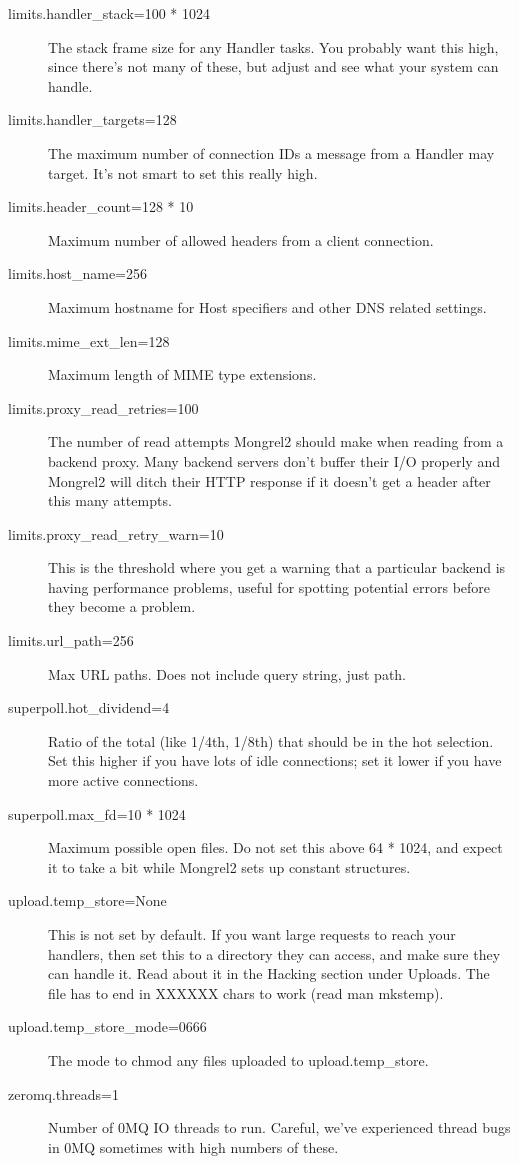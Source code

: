 \begin{description}
\item[limits.handler\_stack=100 * 1024] The stack frame size for any Handler tasks. You probably want this high, since there's not many of these, but adjust and see what your system can handle.
\item[limits.handler\_targets=128] The maximum number of connection IDs a message from a Handler may target.  It's not smart to set this really high.
\item[limits.header\_count=128 * 10] Maximum number of allowed headers from a client connection.
\item[limits.host\_name=256] Maximum hostname for Host specifiers and other DNS related settings.
\item[limits.mime\_ext\_len=128] Maximum length of MIME type extensions.
\item[limits.proxy\_read\_retries=100] The number of read attempts Mongrel2 should make when reading from a backend proxy. Many backend servers don't buffer their I/O properly and Mongrel2 will ditch their HTTP response if it doesn't get a header after this many attempts.
\item[limits.proxy\_read\_retry\_warn=10] This is the threshold where you get a warning that a particular backend is having performance problems, useful for spotting potential errors before they become a problem.
\item[limits.url\_path=256] Max URL paths. Does not include query string, just path.
\item[superpoll.hot\_dividend=4] Ratio of the total (like 1/4th, 1/8th) that should be in the hot selection.  Set this higher if you have lots of idle connections; set it lower if you have more active connections.
\item[superpoll.max\_fd=10 * 1024] Maximum possible open files.  Do not set this above 64 * 1024, and expect it to take a bit while Mongrel2 sets up constant structures.
\item[upload.temp\_store=None] This is not set by default.  If you want large requests to reach your handlers, then set this to a directory they can access, and make sure they can handle it.  Read about it in the Hacking section under Uploads.  The file has to end in XXXXXX chars to work (read man mkstemp).
\item[upload.temp\_store\_mode=0666] The mode to chmod any files uploaded to upload.temp\_store.
\item[zeromq.threads=1] Number of 0MQ IO threads to run.  Careful, we've experienced thread bugs in 0MQ sometimes with high numbers of these.


\end{description}
